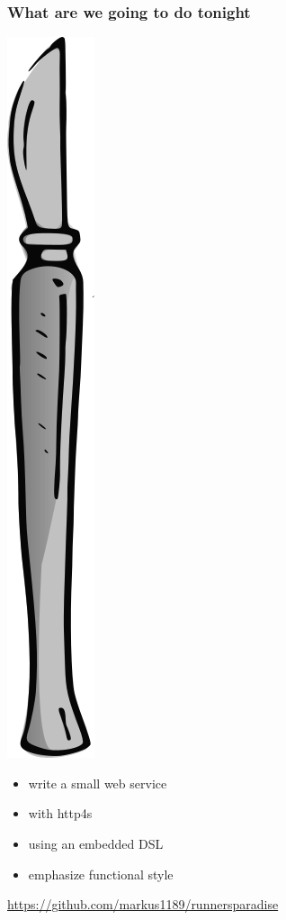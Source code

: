 \documentclass{beamer}
\begin{document}
\begin{frame}
  \frametitle{What are we going to do tonight}
  \begin{minipage}{0.2\linewidth}
    \includegraphics[width=0.19\linewidth]{pics/scalpel.png}
  \end{minipage}
  \begin{minipage}{0.7\linewidth}
    \begin{itemize}
    \item write a small web service
    \item with http4s
    \item using an embedded DSL
    \item emphasize functional style
    \end{itemize}
  \end{minipage}
  \vfill
  \begin{center}
    \url{https://github.com/markus1189/runnersparadise}
  \end{center}
\end{frame}
\end{document}
